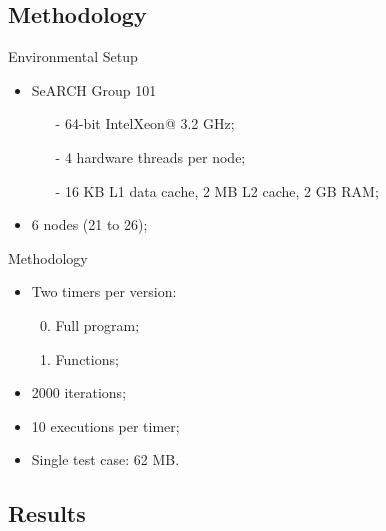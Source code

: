 \documentclass{beamer}
\begin{document}
\subsection{Methodology}
\begin{frame}
	\begin{block}{Environmental Setup}
		\begin{itemize}
			\item{SeARCH Group 101
			\begin{itemize}
				\item[-]{64-bit Intel\textregistered Xeon\texttrademark @ 3.2 GHz;}
				\item[-]{4 hardware threads per node;}
				\item[-]{16 KB L1 data cache, 2 MB L2 cache, 2 GB RAM;}
			\end{itemize}
			}
			\item{6 nodes (21 to 26);}
		\end{itemize}
	\end{block}
	\pause
	\begin{block}{Methodology}
		\begin{itemize}
			\item{Two timers per version:
			\begin{enumerate}
				\setcounter{enumi}{-1}
				\item{Full program;}
				\item{Functions;}
			\end{enumerate}
			}
			\item{2000 iterations;}
			\item{10 executions per timer;}
			\item{Single test case: 62 MB.}
		\end{itemize}
	\end{block}
\end{frame}



%
%
%
%

\subsection{Results}
%
\end{document}
